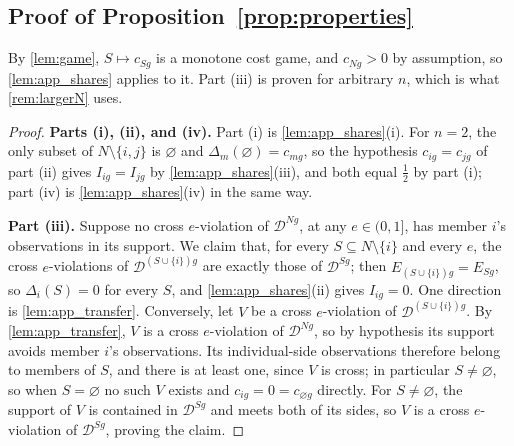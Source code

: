 \documentclass[11 pt]{article}
\begin{document}
\subsection{Proof of Proposition~\ref{prop:properties}}\label{subsec:app_properties}

By \autoref{lem:game}, $S \mapsto c_{Sg}$ is a monotone cost game, and $c_{Ng} > 0$ by assumption, so \autoref{lem:app_shares} applies to it. Part (iii) is proven for arbitrary $n$, which is what \autoref{rem:largerN} uses.

\begin{proof}
\textbf{Parts (i), (ii), and (iv).} Part (i) is \autoref{lem:app_shares}(i). For $n = 2$, the only subset of $N \setminus \{i,j\}$ is $\varnothing$ and $\Delta_{m}(\varnothing) = c_{mg}$, so the hypothesis $c_{ig} = c_{jg}$ of part (ii) gives $I_{ig} = I_{jg}$ by \autoref{lem:app_shares}(iii), and both equal $\tfrac{1}{2}$ by part (i); part (iv) is \autoref{lem:app_shares}(iv) in the same way.

\textbf{Part (iii).} Suppose no cross $e$-violation of $\mathcal{D}^{Ng}$, at any $e \in (0,1]$, has member $i$'s observations in its support. We claim that, for every $S \subseteq N \setminus \{i\}$ and every $e$, the cross $e$-violations of $\mathcal{D}^{(S \cup \{i\})g}$ are exactly those of $\mathcal{D}^{Sg}$; then $E_{(S \cup \{i\})g} = E_{Sg}$, so $\Delta_{i}(S) = 0$ for every $S$, and \autoref{lem:app_shares}(ii) gives $I_{ig} = 0$. One direction is \autoref{lem:app_transfer}. Conversely, let $V$ be a cross $e$-violation of $\mathcal{D}^{(S \cup \{i\})g}$. By \autoref{lem:app_transfer}, $V$ is a cross $e$-violation of $\mathcal{D}^{Ng}$, so by hypothesis its support avoids member $i$'s observations. Its individual-side observations therefore belong to members of $S$, and there is at least one, since $V$ is cross; in particular $S \neq \varnothing$, so when $S = \varnothing$ no such $V$ exists and $c_{ig} = 0 = c_{\varnothing g}$ directly. For $S \neq \varnothing$, the support of $V$ is contained in $\mathcal{D}^{Sg}$ and meets both of its sides, so $V$ is a cross $e$-violation of $\mathcal{D}^{Sg}$, proving the claim.


\end{proof}
\end{document}
